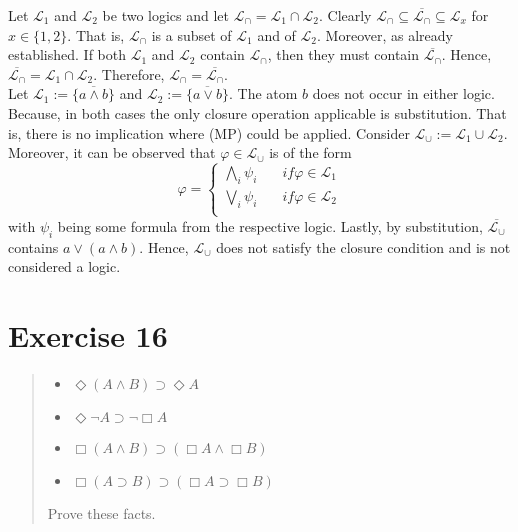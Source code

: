 \documentclass[11pt,a4paper]{article}
\newcommand{\lto}{\supset}
\newcommand{\some}{\Diamond}
\newcommand{\all}{\Box}
\begin{document}
Let $\mathcal{L}_1$ and $\mathcal{L}_2$ be two logics and let $\mathcal{L}_{\cap} = \mathcal{L}_1 \cap \mathcal{L}_2$.  
Clearly $\mathcal{L}_{\cap} \subseteq \overline{\mathcal{L}_{\cap}} \subseteq \mathcal{L}_x$ for $x \in \{1,2\}$. That is, $\mathcal{L}_{\cap}$ is a subset of $\mathcal{L}_1$ and of $\mathcal{L}_{2}$. Moreover, as already established. If both $\mathcal{L}_1$ and $\mathcal{L}_{2}$ contain $\mathcal{L}_{\cap}$, then they must contain $\overline{\mathcal{L}_{\cap}}$. Hence, $\overline{\mathcal{L}_{\cap}}=\mathcal{L}_1 \cap \mathcal{L}_2$. Therefore, $\mathcal{L}_{\cap} = \overline{\mathcal{L}_{\cap}}$. \\


Let $\mathcal{L}_1:=\overline{\{a \land b\}}$ and $\mathcal{L}_2:=\overline{\{a \lor b\}}$. The atom $b$ does not occur in either logic. Because, in both cases the only closure operation applicable is substitution. That is, there is no implication where (MP) could be applied. Consider $\mathcal{L}_{\cup}:= \mathcal{L}_1 \cup \mathcal{L}_2$. Moreover, it can be observed that $\varphi \in \mathcal{L}_{\cup}$ is of the form
\begin{equation*}
\varphi = \begin{cases}
\bigwedge_{i} \psi_i  & \quad \mathit{if} \varphi \in \mathcal{L}_1 \\
\bigvee_{i} \psi_i & \quad \mathit{if} \varphi \in \mathcal{L}_2 \\
\end{cases}
\end{equation*}
with $\psi_i$ being some formula from the respective logic. 
Lastly, by substitution, $\overline{\mathcal{L}_{\cup}}$ contains $a \lor (a \land b)$. Hence, $\mathcal{L}_{\cup}$ does not satisfy the closure condition and is not considered a logic.





\section*{Exercise 16}
\begin{quote}
\begin{itemize}
\item $\some (A \land B) \lto \some  A$
\item $\some \neg A \lto  \neg \all  A$
\item $\all (A \land B) \lto (\all A \land \all B) $
\item $\all (A \lto B) \lto (\all A \lto \all B) $
\end{itemize}
Prove these facts.
\end{quote}
\end{document}
